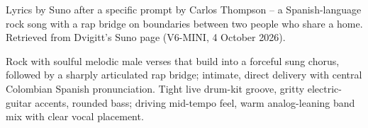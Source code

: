 
\begin{notes}
Lyrics by Suno after a specific prompt by Carlos Thompson -- a Spanish-language rock song with a rap bridge on boundaries between two people who share a home. Retrieved from Dvigitt's Suno page (V6-MINI, 4 October 2026).
\end{notes}
\begin{style}
Rock with soulful melodic male verses that build into a forceful sung chorus, followed by a sharply articulated rap bridge; intimate, direct delivery with central Colombian Spanish pronunciation. Tight live drum-kit groove, gritty electric-guitar accents, rounded bass; driving mid-tempo feel, warm analog-leaning band mix with clear vocal placement.
\end{style}
